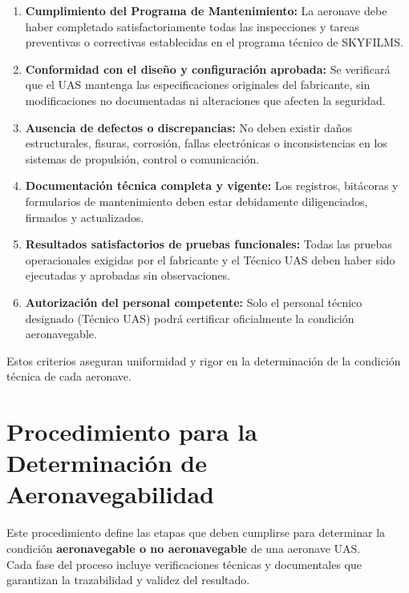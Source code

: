 \begin{enumerate}
    \item \textbf{Cumplimiento del Programa de Mantenimiento:} La aeronave debe haber completado satisfactoriamente todas las inspecciones y tareas preventivas o correctivas establecidas en el programa técnico de SKYFILMS.

    \item \textbf{Conformidad con el diseño y configuración aprobada:} Se verificará que el UAS mantenga las especificaciones originales del fabricante, sin modificaciones no documentadas ni alteraciones que afecten la seguridad.

    \item \textbf{Ausencia de defectos o discrepancias:} No deben existir daños estructurales, fisuras, corrosión, fallas electrónicas o inconsistencias en los sistemas de propulsión, control o comunicación.

    \item \textbf{Documentación técnica completa y vigente:} Los registros, bitácoras y formularios de mantenimiento deben estar debidamente diligenciados, firmados y actualizados.

    \item \textbf{Resultados satisfactorios de pruebas funcionales:} Todas las pruebas operacionales exigidas por el fabricante y el Técnico UAS deben haber sido ejecutadas y aprobadas sin observaciones.

    \item \textbf{Autorización del personal competente:} Solo el personal técnico designado (Técnico UAS) podrá certificar oficialmente la condición aeronavegable.
\end{enumerate}

Estos criterios aseguran uniformidad y rigor en la determinación de la condición técnica de cada aeronave.

\section{Procedimiento para la Determinación de Aeronavegabilidad}

Este procedimiento define las etapas que deben cumplirse para determinar la condición \textbf{aeronavegable o no aeronavegable} de una aeronave UAS.\\

Cada fase del proceso incluye verificaciones técnicas y documentales que garantizan la trazabilidad y validez del resultado.

